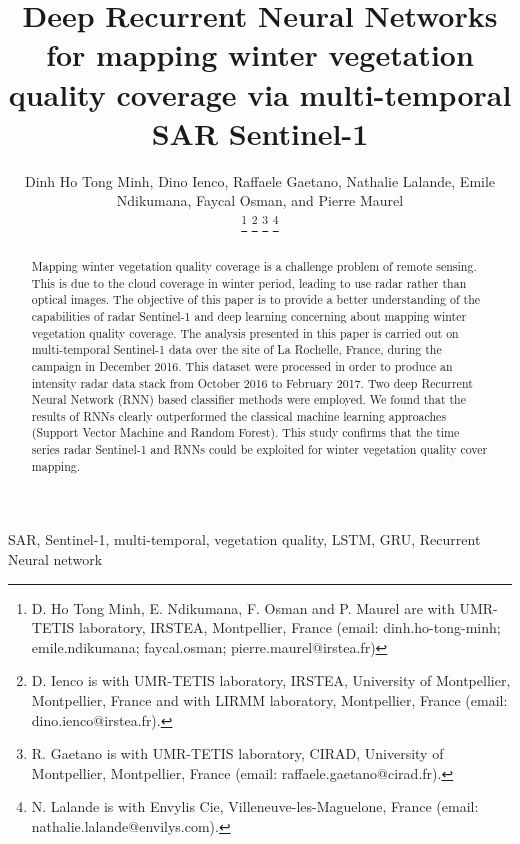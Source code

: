 \documentclass[journal, onecolumn]{IEEEtran}
\begin{document}
\title{Deep Recurrent Neural Networks for mapping winter vegetation quality coverage via multi-temporal SAR Sentinel-1}


\author{Dinh Ho Tong Minh,
		Dino Ienco,
        Raffaele Gaetano,
        Nathalie Lalande,
        Emile Ndikumana,
        Faycal Osman,
        and Pierre Maurel
        
\thanks{ D. Ho Tong Minh, E. Ndikumana, F. Osman and P. Maurel are with UMR-TETIS laboratory, IRSTEA, Montpellier, France (email: dinh.ho-tong-minh; emile.ndikumana; faycal.osman; pierre.maurel@irstea.fr)}
\thanks{D. Ienco is with UMR-TETIS laboratory, IRSTEA, University of Montpellier, Montpellier, France and with LIRMM laboratory, Montpellier, France (email: dino.ienco@irstea.fr).}%
\thanks{R. Gaetano is with UMR-TETIS laboratory, CIRAD, University of Montpellier, Montpellier, France (email: raffaele.gaetano@cirad.fr).}%
\thanks{N. Lalande is with Envylis Cie, Villeneuve-les-Maguelone, France (email: nathalie.lalande@envilys.com).}}


\maketitle


\begin{abstract}
Mapping winter vegetation quality coverage is a challenge problem of remote sensing. This is due to the cloud coverage in winter period, leading to use radar  rather than optical images. The objective of this paper is to provide a better understanding of the capabilities of radar Sentinel-1 and deep learning concerning about  mapping winter vegetation quality coverage. The analysis presented in this paper is carried out on multi-temporal Sentinel-1 data over the site of La Rochelle, France, during the campaign in December 2016. This dataset were processed in order to produce an intensity radar data stack from October 2016 to February 2017. Two deep Recurrent Neural Network (RNN) based classifier methods were employed. We found that the results of RNNs clearly outperformed the classical machine learning approaches (Support Vector Machine and Random Forest). This study confirms that the  time series radar Sentinel-1 and RNNs could be exploited for winter vegetation quality cover mapping.
\end{abstract}

\begin{IEEEkeywords}
SAR, Sentinel-1, multi-temporal, vegetation quality, LSTM, GRU, Recurrent Neural network
\end{IEEEkeywords}
\end{document}
